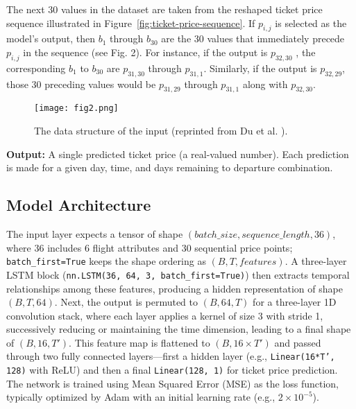 \documentclass[conference]{IEEEtran}
\begin{document}
The next 30 values in the dataset are taken from the reshaped ticket price sequence illustrated in Figure~\ref{fig:ticket-price-sequence}. If $p_{i,j}$  is selected as the model’s output, then $b_{1}$ through $b_{30}$  are the 30 values that immediately precede $p_{i,j}$ in the sequence (see Fig. 2). For instance, if the output is $p_{32,30}$ , the corresponding $b_{1}$  to $b_{30}$ are $p_{31,30}$ through $p_{31,1}$. Similarly, if the output is $p_{32,29}$, those 30 preceding values would be $p_{31,29}$ through $p_{31,1}$ along with $p_{32,30}$. 

\begin{figure}[htbp]
\centerline{\texttt{[image: fig2.png]}}
\caption{The data structure of the input (reprinted from Du et al. \cite{b11}).}
\label{data-structure}
\end{figure}

\textbf{Output:} A single predicted ticket price (a real-valued number). Each prediction is made for a given day, time, and days remaining to departure combination.

\subsection{Model Architecture}\label{5c}
The input layer expects a tensor of shape $(batch\_size, sequence\_length, 36)$, where 36 includes 6 flight attributes and 30 sequential price points; \texttt{batch\_first=True} keeps the shape ordering as $(B, T, features)$. A three-layer LSTM block (\texttt{nn.LSTM(36, 64, 3, batch\_first=True)}) then extracts temporal relationships among these features, producing a hidden representation of shape $(B, T, 64)$. Next, the output is permuted to $(B, 64, T)$ for a three-layer 1D convolution stack, where each layer applies a kernel of size 3 with stride 1, successively reducing or maintaining the time dimension, leading to a final shape of $(B, 16, T')$. This feature map is flattened to $(B, 16 \times T')$ and passed through two fully connected layers—first a hidden layer (e.g., \texttt{Linear(16*T', 128)} with ReLU) and then a final \texttt{Linear(128, 1)} for ticket price prediction. The network is trained using Mean Squared Error (MSE) as the loss function, typically optimized by Adam with an initial learning rate (e.g., $2 \times 10^{-5}$).
\end{document}
